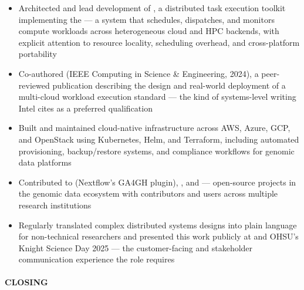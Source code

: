 \begin{itemize}

\item Architected and lead development of , a distributed task execution toolkit implementing the  --- a system that schedules, dispatches, and monitors compute workloads across heterogeneous cloud and HPC backends, with explicit attention to resource locality, scheduling overhead, and cross-platform portability

\item Co-authored  (IEEE Computing in Science \& Engineering, 2024), a peer-reviewed publication describing the design and real-world deployment of a multi-cloud workload execution standard --- the kind of systems-level writing Intel cites as a preferred qualification

\item Built and maintained cloud-native infrastructure across AWS, Azure, GCP, and OpenStack using Kubernetes, Helm, and Terraform, including automated provisioning, backup/restore systems, and compliance workflows for genomic data platforms

\item Contributed to  (Nextflow's GA4GH plugin), , and  --- open-source projects in the genomic data ecosystem with contributors and users across multiple research institutions

\item Regularly translated complex distributed systems designs into plain language for non-technical researchers and presented this work publicly at  and OHSU's Knight Science Day 2025 --- the customer-facing and stakeholder communication experience the role requires

\end{itemize}

\paragraph{CLOSING}\

